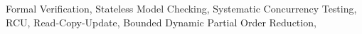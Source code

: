 Formal Verification, Stateless Model Checking, Systematic Concurrency Testing, RCU, Read-Copy-Update, Bounded Dynamic Partial Order Reduction,